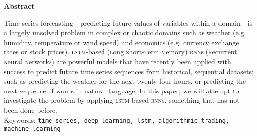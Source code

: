 \begin{center}
  \textbf{Abstract}

  \vspace{5mm}

  \small\parbox{0.8\textwidth}{
    Time series forecasting---predicting future values of variables within a domain---is a largely unsolved problem in complex or chaotic domains such as weather (e.g. humidity, temperature or wind speed) and economics (e.g. currency exchange rates or stock prices). \textsc{lstm}-based (\textsc{l}ong \textsc{s}hort-\textsc{t}erm \textsc{m}emory) \textsc{rnn}s (\textsc{r}ecurrent \textsc{n}eural \textsc{n}etworks) are powerful models that have recently been applied with success to predict future time series sequences from historical, sequential datasets; such as predicting the weather for the next twenty-four hours, or predicting the next sequence of words in natural language. In this paper, we will attempt to investigate the problem by applying \textsc{lstm}-based \textsc{rnn}s, something that has not been done before.\\

    Keywords: \texttt{time series, deep learning, lstm, algorithmic trading, machine learning}
  }
\end{center}
